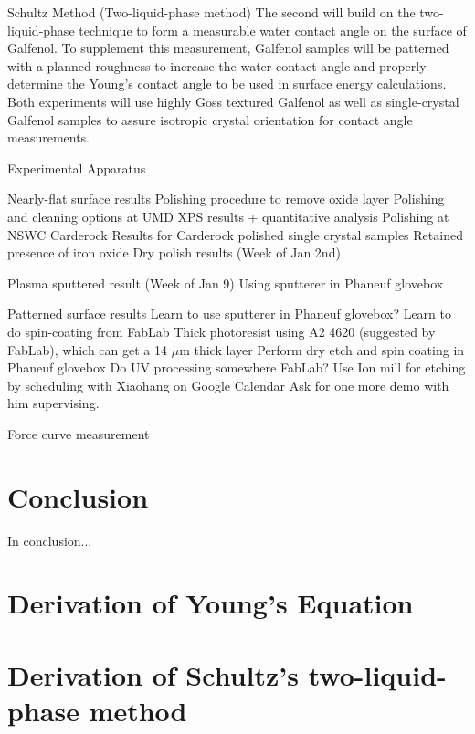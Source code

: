 \documentclass[12pt,letterpaper]{report}
\begin{document}
\begin{outline}[enumerate]
\1 Schultz Method (Two-liquid-phase method)
	The second will build on the two-liquid-phase technique to form a measurable water contact angle on the surface of Galfenol. To supplement this measurement, Galfenol samples will be patterned with a planned roughness to increase the water contact angle and properly determine the Young's contact angle to be used in surface energy calculations. Both experiments will use highly Goss textured Galfenol as well as single-crystal Galfenol samples to assure isotropic crystal orientation for contact angle measurements. 
	
	
	\2 Experimental Apparatus
	
	
\1 Nearly-flat surface results
	\2 Polishing procedure to remove oxide layer
		\3 Polishing and cleaning options at UMD
			\4 XPS results + quantitative analysis
		\3 Polishing at NSWC Carderock
	\2 Results for Carderock polished single crystal samples
		\3 Retained presence of iron oxide
	\2 Dry polish results (Week of Jan 2nd)
	
	\2 Plasma sputtered result (Week of Jan 9)
		\3 Using sputterer in Phaneuf glovebox
		
\1 Patterned surface results
	\2 Learn to use sputterer in Phaneuf glovebox?
	\2 Learn to do spin-coating from FabLab
		\3 Thick photoresist using A2 4620 (suggested by FabLab), which can get a 14 $\mu$m thick layer
	\2 Perform dry etch and spin coating in Phaneuf glovebox
	\2 Do UV processing somewhere
		\3 FabLab?
	\2 Use Ion mill for etching by scheduling with Xiaohang on Google Calendar
		\3 Ask for one more demo with him supervising. 
	
\1 Force curve measurement
	
	
	
\end{outline}


%

\chapter{Conclusion}
In conclusion...

\newpage
\appendix
\chapter{Derivation of Young's Equation}\label{appendixA}


\chapter{Derivation of Schultz's two-liquid-phase method}\label{appendixB}


\newpage


\end{document}
